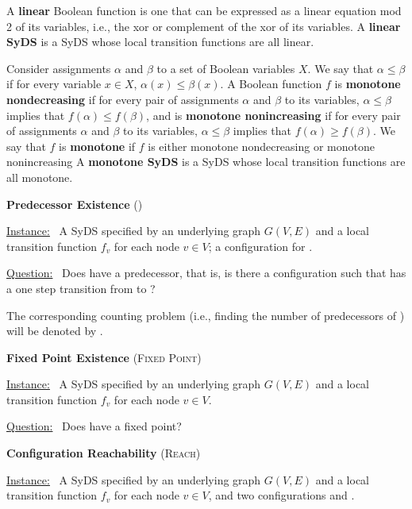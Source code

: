 A {\bf linear} Boolean function is one that can be expressed as a linear equation mod 2 of its variables,
i.e., the xor or complement of the xor of its variables.
A {\bf linear SyDS} is a SyDS whose local transition functions are all linear.

Consider assignments $\alpha$ and $\beta$ to a set of Boolean variables $X$.
We say that $\alpha \leq \beta$ if for every variable $x \in X$, $\alpha(x) \leq \beta(x)$.
A Boolean function $f$  is {\bf monotone nondecreasing}
if for every pair of assignments $\alpha$ and $\beta$ to its variables,
$\alpha \leq \beta$ implies that $f(\alpha) \leq f(\beta)$,
and is {\bf monotone nonincreasing}
if for every pair of assignments $\alpha$ and $\beta$ to its variables,
$\alpha \leq \beta$ implies that $f(\alpha) \geq f(\beta)$.
We say that $f$ is {\bf monotone} if $f$ is either monotone nondecreasing or monotone nonincreasing
A {\bf monotone SyDS} is a SyDS whose local transition functions are all monotone.


\medskip
\noindent
\textbf{Predecessor Existence} (\pre)

\smallskip
\noindent
\underline{\textsf{Instance:}}~ A SyDS \cals{} specified 
by an underlying
graph $G(V,E)$ and a local transition function $f_v$ for each node $v \in V$;
a configuration \calc{} for \cals.

\smallskip
\noindent
\underline{\textsf{Question:}}~ Does \calc{} have a predecessor, 
that is, is there
a configuration \calcp{} such that \cals{} has a one step transition
from \calcp{} to \calc?  

\medskip
The corresponding counting problem (i.e., finding the number
of predecessors of \calc) will be denoted by \npre.

\medskip
\noindent
\textbf{Fixed Point Existence} (\textsc{Fixed Point})

\smallskip
\noindent
\underline{\textsf{Instance:}}~ A SyDS \cals{} specified 
by an underlying
graph $G(V,E)$ and a local transition function $f_v$ for each node $v \in V$.

\smallskip
\noindent
\underline{\textsf{Question:}}~ Does \cals{} have a fixed point?  

\medskip
\noindent
\textbf{Configuration Reachability} (\textsc{Reach})

\smallskip
\noindent
\underline{\textsf{Instance:}}~ A SyDS \cals{} specified 
by an underlying
graph $G(V,E)$ and a local transition function $f_v$ for each node $v \in V$,
and two configurations \calc{} and \cald{}. 

